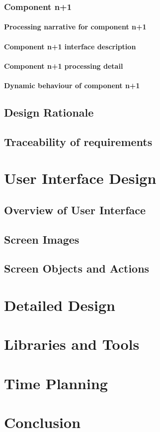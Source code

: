 \documentclass[]{report}
\begin{document}
\subsection{Component n+1}
\subsubsection{Processing narrative for component n+1}
\subsubsection{Component n+1 interface description}
\subsubsection{Component n+1 processing detail}
\subsubsection{Dynamic behaviour of component n+1}
\section{Design Rationale}
\section{Traceability of requirements}

\chapter{User Interface Design}
\section{Overview of User Interface}
\section{Screen Images}
\section{Screen Objects and Actions}

\chapter{Detailed Design}

\chapter{Libraries and Tools}

\chapter{Time Planning}

\chapter{Conclusion}



\end{document}
